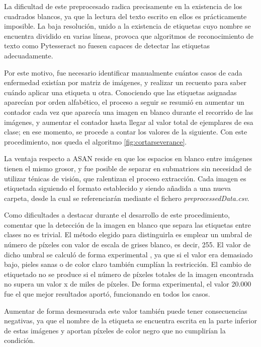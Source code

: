  La dificultad de este preprocesado radica precisamente en la existencia de los cuadrados blancos, ya que la lectura del texto escrito en ellos es prácticamente imposible. La baja resolución, unido a la existencia de etiquetas cuyo nombre se encuentra dividido en varias líneas, provoca que algoritmos de reconocimiento de texto como Pytesseract \cite {pytesseract} no fuesen capaces de detectar las etiquetas adecuadamente.
 
 Por este motivo, fue necesario identificar manualmente cuántos casos de cada enfermedad existían por matriz de imágenes, y realizar un recuento para saber cuándo aplicar una etiqueta u otra. Conociendo que las etiquetas asignadas aparecían por orden alfabético, el proceso a seguir se resumió en aumentar un contador cada vez que aparecía una imagen en blanco durante el recorrido de las imágenes, y aumentar el contador hasta llegar al valor total de ejemplares de esa clase; en ese momento, se procede a contar los valores de la siguiente. Con este procedimiento, nos queda el algoritmo \ref{fig:cortarseverance}.
  
La ventaja respecto a ASAN reside en que los espacios en blanco entre imágenes tienen el mismo grosor, y fue posible de separar en submatrices sin necesidad de utilizar ténicas de visión, que ralentizan el proceso extracción. Cada imagen es etiquetada siguiendo el formato establecido  y siendo añadida a una nueva carpeta, desde la cual se referenciarán mediante el fichero \textit{preprocessedData.csv}.

Como dificultades a destacar durante el desarrollo de este procedimiento, comentar que la detección de la imagen en blanco que separa las etiquetas entre clases no es trivial. El método elegido para distinguirla es emplear un  umbral de número de píxeles con valor de escala de grises blanco, es decir, 255. El valor de dicho umbral se calculó de forma experimental , ya que si el valor era demasiado bajo, pieles sanas o de color claro también cumplían la restricción. El cambio de etiquetado no se produce si el número de píxeles totales de la imagen encontrada no supera un valor x de miles de píxeles. De forma experimental, el valor 20.000 fue el que mejor resultados aportó, funcionando en todos los casos.

Aumentar de forma desmesurada este valor también puede tener consecuencias negativas, ya que el nombre de la etiqueta se encuentra escrita en la parte inferior de estas imágenes y aportan píxeles de color negro que no cumplirían la condición.


